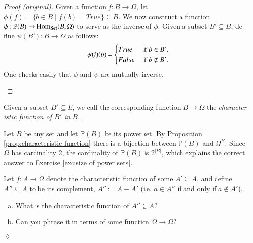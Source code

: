 \documentclass{book}
\def\tn{\textnormal}
\def\PP{{\mathbb P}}
\def\Hom{\tn{Hom}}
\def\to{\rightarrow}
\def\taking{\colon}
\def\ss{\subseteq}
\def\|{{\;|\;}}
\def\Set{{\bf Set}}
\theoremstyle{theoremENG}
\theoremstyle{lemmaENG}
\theoremstyle{propositionENG}
\newtheorem{propositionENG}[subsubsection]{\begin{english}Proposition\end{english}}
\theoremstyle{corollaryENG}
\theoremstyle{factENG}
\theoremstyle{remarkENG}
\theoremstyle{exampleENG}
\theoremstyle{warningENG}
\theoremstyle{questionENG}
\theoremstyle{guessENG}
\theoremstyle{answerENG}
\theoremstyle{constructionENG}
\theoremstyle{rulesENG}
\theoremstyle{excENG}
\newtheorem{excENG}[subsubsection]{\begin{english}Exercise\end{english}}
\theoremstyle{appENG}
\theoremstyle{definitionENG}
\newtheorem{definitionENG}[subsubsection]{\begin{english}Definition\end{english}}
\theoremstyle{notationENG}
\theoremstyle{conjectureENG}
\theoremstyle{postulateENG}
\newenvironment{proofENG}{\begin{proof}[Proof (original)]}{\end{proof}}
\newenvironment{exerciseENG}{\begin{excENG}}{\hspace*{\fill}$\lozenge$\end{excENG}}
\theoremstyle{theoremRUS}
\theoremstyle{lemmaRUS}
\theoremstyle{propositionRUS}
\theoremstyle{corollaryRUS}
\theoremstyle{factRUS}
\theoremstyle{remarkRUS}
\theoremstyle{exampleRUS}
\theoremstyle{warningRUS}
\theoremstyle{questionRUS}
\theoremstyle{guessRUS}
\theoremstyle{answerRUS}
\theoremstyle{constructionRUS}
\theoremstyle{rulesRUS}
\theoremstyle{excRUS}
\theoremstyle{appRUS}
\theoremstyle{definitionRUS}
\theoremstyle{notationRUS}
\theoremstyle{conjectureRUS}
\theoremstyle{postulateRUS}
\def\sexc{\begin{enumerate}[a.)]\setlength{\itemsep}{.1cm}\setlength{\parskip}{.1cm}\item}
\def\next{\item}
\def\endsexc{\end{enumerate}}
\begin{document}
\begin{english}
\begin{propositionENG}
\begin{russian} \end{russian}

\end{propositionENG}

\begin{proofENG}

Given a function $f\taking B\to\Omega$, let $\phi(f)=\{b\in B\|f(b)=True\}\ss B$. We now construct a function $\psi\taking\PP(B)\to\Hom_\Set(B,\Omega)$ to serve as the inverse of $\phi$. Given a subset $B'\ss B$, define $\psi(B')\taking B\to\Omega$ as follows: 
$$\psi(i)(b)=\begin{cases}
True&\tn{ if } b\in B',\\
False&\tn{ if } b\not\in B'.
\end{cases}
$$
One checks easily that $\phi$ and $\psi$ are mutually inverse.

\begin{russian} \end{russian}

\end{proofENG}

\begin{definitionENG}

Given a subset $B'\ss B$, we call the corresponding function $B\to\Omega$ the {\em characteristic function of $B'$ in $B$.}

\begin{russian} \end{russian}

\end{definitionENG}

Let $B$ be any set and let $\PP(B)$ be its power set. By Proposition \ref{prop:characteristic function} there is a bijection between $\PP(B)$ and $\Omega^B$. Since $\Omega$ has cardinality 2, the cardinality of $\PP(B)$ is $2^{|B|}$, which explains the correct answer to Exercise \ref{exc:size of power sets}.

\begin{russian} \end{russian}

\begin{exerciseENG}

Let $f\taking A\to\Omega$ denote the characteristic function of some $A'\ss A$, and define $A''\ss A$ to be its complement, $A'':=A-A'$ (i.e. $a\in A''$ if and only if $a\not\in A'$). 
\sexc What is the characteristic function of $A''\ss A$? 
\next Can you phrase it in terms of some function $\Omega\to\Omega$?
\endsexc


\end{exerciseENG}
\end{english}
\end{document}
